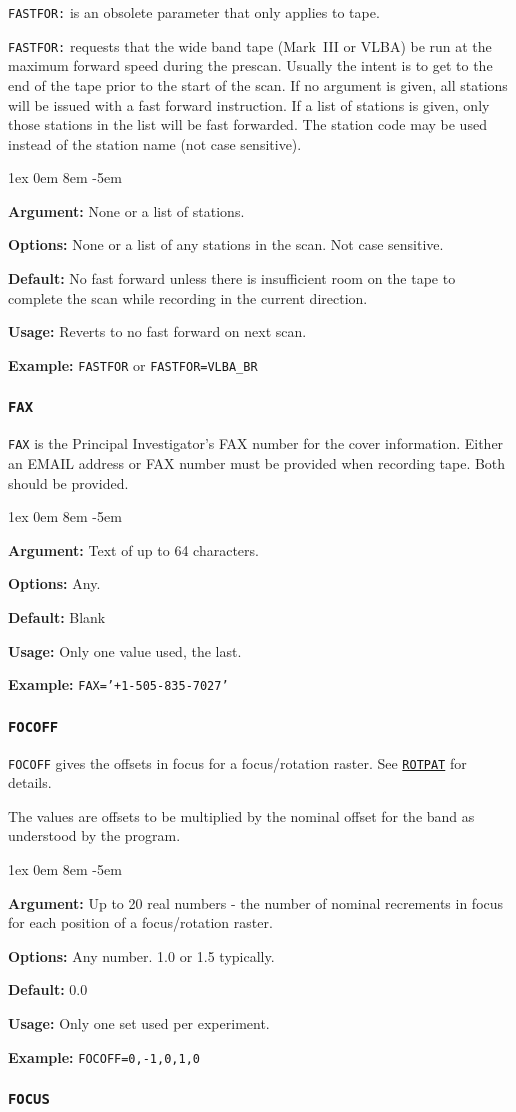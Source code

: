 \documentclass{report}
\newcommand{\rcwbox}[5]{
  \begin{list}{}{\parsep 1ex  \itemsep 0em
                 \leftmargin 8em  \itemindent -5em }
    \item {\bf Argument:} #1
    \item {\bf Options:}  #2
    \item {\bf Default:}  #3
    \item {\bf Usage:}    #4
    \item {\bf Example:}  #5
  \end{list}
}
\begin{document}
{\tt FASTFOR:} is an obsolete parameter that only applies to tape.

{\tt FASTFOR:} requests that the wide band tape (Mark~III or
VLBA) be run at the maximum forward speed during the prescan. Usually
the intent is to get to the end of the tape prior to the start of the
scan. If no argument is given, all stations will be issued with a fast
forward instruction. If a list of stations is given, only those
stations in the list will be fast forwarded.  The station code may
be used instead of the station name (not case sensitive).

\rcwbox
{None or a list of stations.}
{None or a list of any stations in the scan. Not case sensitive.}
{No fast forward unless there is insufficient room on the tape to
complete the scan while recording in the current direction.}
{Reverts to no fast forward on next scan.}
{{\tt FASTFOR} or {\tt FASTFOR=VLBA\_BR}}


\subsubsection{\label{MP:FAX}{\tt FAX}}

{\tt FAX} is the  Principal Investigator's FAX number for the cover
information.  Either an EMAIL address or FAX number must be provided
when recording tape.  Both should be provided.

\rcwbox
{Text of up to 64 characters.}
{Any.}
{Blank}
{Only one value used, the last.}
{{\tt FAX='+1-505-835-7027'}}


\subsubsection{\label{MP:FOCOFF}\tt FOCOFF}

{\tt FOCOFF} gives the offsets in focus for a focus/rotation raster.
See 
{\hyperref[MP:ROTPAT]{{\tt ROTPAT}}} for details.

The values are offsets to be multiplied by the nominal offset
for the band as understood by the program.

\rcwbox
{Up to 20 real numbers - the number of nominal recrements in
focus for each position of a focus/rotation raster.}
{Any number.  1.0 or 1.5 typically.}
{0.0}
{Only one set used per experiment.}
{{\tt FOCOFF=0,-1,0,1,0}}


\subsubsection{\label{MP:FOCUS}\tt FOCUS}
\end{document}
